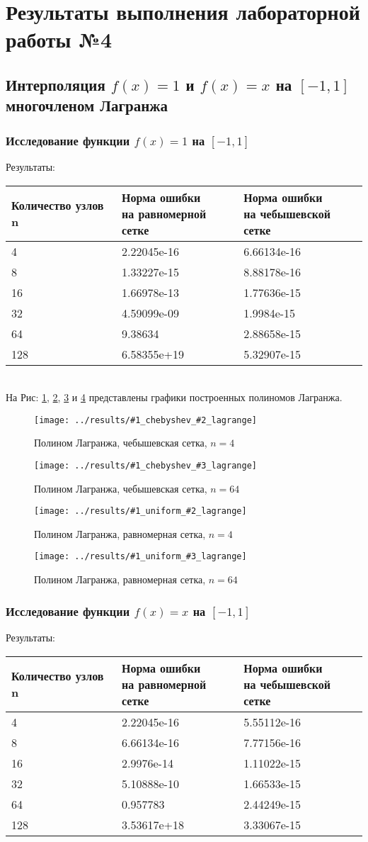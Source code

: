 \documentclass[12pt]{article}
\date{}
\author{}
\newcommand{\lagrange}[3] {
	На Рис: \ref{fig:#1chebyshev#2lagrange},  \ref{fig:#1chebyshev#3lagrange}, \ref{fig:#1uniform#2lagrange} и \ref{fig:#1uniform#3lagrange}
	представлены графики построенных полиномов Лагранжа.
	
	\begin{figure}[H]
		\centering
		\texttt{[image: ../results/\#1\_chebyshev\_\#2\_lagrange]}
		\caption{Полином Лагранжа, чебышевская сетка, $n = #2$}
		\label{fig:#1chebyshev#2lagrange}
	\end{figure}
	\begin{figure}[H]
		\centering
		\texttt{[image: ../results/\#1\_chebyshev\_\#3\_lagrange]}
		\caption{Полином Лагранжа, чебышевская сетка, $n = #3$}
		\label{fig:#1chebyshev#3lagrange}
	\end{figure}
	\begin{figure}[H]
		\centering
		\texttt{[image: ../results/\#1\_uniform\_\#2\_lagrange]}
		\caption{Полином Лагранжа, равномерная сетка, $n = #2$}
		\label{fig:#1uniform#2lagrange}
	\end{figure}
	\begin{figure}[H]
		\centering
		\texttt{[image: ../results/\#1\_uniform\_\#3\_lagrange]}
		\caption{Полином Лагранжа, равномерная сетка, $n = #3$}
		\label{fig:#1uniform#3lagrange}
	\end{figure}
}
\begin{document}
	
\tableofcontents
\clearpage
\section{Результаты выполнения лабораторной работы №4}
\subsection{Интерполяция $f(x) = 1$ и $f(x) = x$ на $[-1, 1]$ многочленом Лагранжа}

\subsubsection{Исследование функции $f(x) = 1$ на $[-1, 1]$}
Результаты:\\
\begin{tabular}{|l|l|l|}
\hline Количество узлов n & \pbox{20cm}{Норма ошибки\\ на равномерной сетке} & \pbox{20cm}{Норма ошибки\\ на чебышевской сетке} \\ \hline
4 & 2.22045e-16 & 6.66134e-16 \\ \hline
8 & 1.33227e-15 & 8.88178e-16 \\ \hline
16 & 1.66978e-13 & 1.77636e-15 \\ \hline
32 & 4.59099e-09 & 1.9984e-15 \\ \hline
64 & 9.38634 & 2.88658e-15 \\ \hline
128 & 6.58355e+19 & 5.32907e-15 \\ \hline
\end{tabular}\\
\lagrange{const}{4}{64}

\subsubsection{Исследование функции $f(x) = x$ на $[-1, 1]$}
Результаты:\\
\begin{tabular}{|l|l|l|}
\hline Количество узлов n & \pbox{20cm}{Норма ошибки\\ на равномерной сетке} & \pbox{20cm}{Норма ошибки\\ на чебышевской сетке} \\ \hline
4 & 2.22045e-16 & 5.55112e-16 \\ \hline
8 & 6.66134e-16 & 7.77156e-16 \\ \hline
16 & 2.9976e-14 & 1.11022e-15 \\ \hline
32 & 5.10888e-10 & 1.66533e-15 \\ \hline
64 & 0.957783 & 2.44249e-15 \\ \hline
128 & 3.53617e+18 & 3.33067e-15 \\ \hline
\end{tabular}\\
\end{document}
